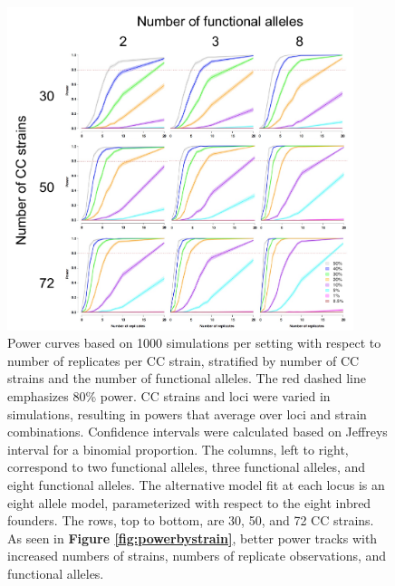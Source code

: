 \begin{figure}
\renewcommand{\familydefault}{\sfdefault}\normalfont
\centering
\includegraphics[width=0.9\textwidth, trim={0in 0in 0in 0in}, clip]{figures/3-sparcc/power_by_rep_panel.pdf}
\caption[Panel of power curves with respect to number of replicate observations]{Power curves based on 1000 simulations per setting with respect to number of replicates per CC strain, stratified by number of CC strains and the number of functional alleles. The red dashed line emphasizes 80\% power. CC strains and loci were varied in simulations, resulting in powers that average over loci and strain combinations. Confidence intervals were calculated based on Jeffreys interval for a binomial proportion. The columns, left to right, correspond to two functional alleles, three functional alleles, and eight functional alleles. The alternative model fit at each locus is an eight allele model, parameterized with respect to the eight inbred founders. The rows, top to bottom, are 30, 50, and 72 CC strains. As seen in \textbf{Figure \ref{fig:powerbystrain}}, better power tracks with increased numbers of strains, numbers of replicate observations, and functional alleles. \label{fig:powerbyrep}}
\end{figure}

